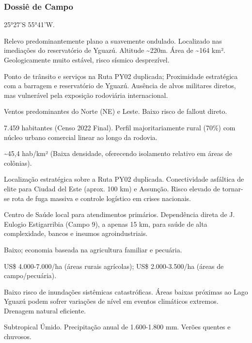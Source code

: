 \subsubsection{Dossiê de Campo}
\begin{description}[style=nextline,leftmargin=0.5cm,font=\bfseries]
\item[Coordenadas]  25°27'S 55°41'W.
\item[Topografia]  Relevo predominantemente plano a suavemente ondulado. Localizado nas imediações do reservatório de Yguazú. Altitude \textasciitilde 220m. Área de \textasciitilde 164 km². Geologicamente muito estável, risco sísmico desprezível.
\item[Alvos Estratégicos]  Ponto de trânsito e serviços na Ruta PY02 duplicada; Proximidade estratégica com a barragem e reservatório de Yguazú. Ausência de alvos militares diretos, mas vulnerável pela exposição rodoviária internacional.
\item[Fallout]  Ventos predominantes do Norte (NE) e Leste. Baixo risco de fallout direto.
\item[População]  7.459 habitantes (Censo 2022 Final). Perfil majoritariamente rural (70\%) com núcleo urbano comercial linear ao longo da rodovia.
\item[Densidade]  \textasciitilde 45,4 hab/\allowbreak km² (Baixa densidade, oferecendo isolamento relativo em áreas de colônias).
\item[Vias de Acesso]  Localização estratégica sobre a Ruta PY02 duplicada. Conectividade asfáltica de elite para Ciudad del Este (aprox. 100 km) e Assunção. Risco elevado de tornar-se rota de fuga massiva e controle logístico em crises nacionais.
\item[Serviços]  Centro de Saúde local para atendimentos primários. Dependência direta de J. Eulogio Estigarribia (Campo 9), a apenas 15 km, para saúde de alta complexidade, bancos e insumos agroindustriais.
\item[Custo de Vida]  Baixo; economia baseada na agricultura familiar e pecuária.
\item[Preço da Terra]  US\$ 4.000-7.000/\allowbreak ha (áreas rurais agrícolas); US\$ 2.000-3.500/\allowbreak ha (áreas de campo/\allowbreak pecuária).
\item[Hidrologia]  Baixo risco de inundações sistêmicas catastróficas. Áreas baixas próximas ao Lago Yguazú podem sofrer variações de nível em eventos climáticos extremos. Drenagem natural eficiente.
\item[Clima]  Subtropical Úmido. Precipitação anual de 1.600-1.800 mm. Verões quentes e chuvosos.

\end{description}
